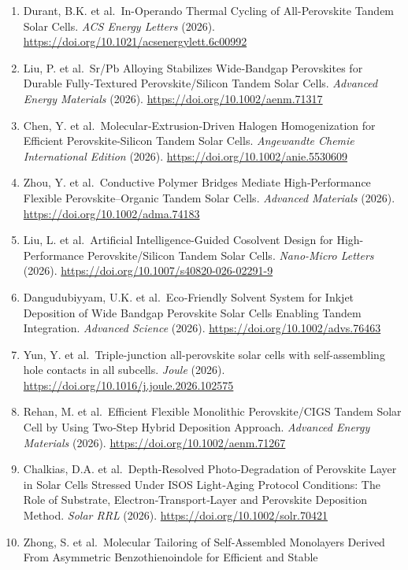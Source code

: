 \documentclass[
  11pt,
]{article}
\begin{document}
\begin{enumerate}
  Photovoltaics. \emph{Chemical Reviews} (2026).
  \url{https://doi.org/10.1021/acs.chemrev.5c01014}
\item
  Durant, B.K. et al.~In-Operando Thermal Cycling of All-Perovskite
  Tandem Solar Cells. \emph{ACS Energy Letters} (2026).
  \url{https://doi.org/10.1021/acsenergylett.6c00992}
\item
  Liu, P. et al.~Sr/Pb Alloying Stabilizes Wide‐Bandgap Perovskites for
  Durable Fully‐Textured Perovskite/Silicon Tandem Solar Cells.
  \emph{Advanced Energy Materials} (2026).
  \url{https://doi.org/10.1002/aenm.71317}
\item
  Chen, Y. et al.~Molecular‐Extrusion‐Driven Halogen Homogenization for
  Efficient Perovskite‐Silicon Tandem Solar Cells. \emph{Angewandte
  Chemie International Edition} (2026).
  \url{https://doi.org/10.1002/anie.5530609}
\item
  Zhou, Y. et al.~Conductive Polymer Bridges Mediate High‐Performance
  Flexible Perovskite--Organic Tandem Solar Cells. \emph{Advanced
  Materials} (2026). \url{https://doi.org/10.1002/adma.74183}
\item
  Liu, L. et al.~Artificial Intelligence-Guided Cosolvent Design for
  High-Performance Perovskite/Silicon Tandem Solar Cells.
  \emph{Nano-Micro Letters} (2026).
  \url{https://doi.org/10.1007/s40820-026-02291-9}
\item
  Dangudubiyyam, U.K. et al.~Eco‐Friendly Solvent System for Inkjet
  Deposition of Wide Bandgap Perovskite Solar Cells Enabling Tandem
  Integration. \emph{Advanced Science} (2026).
  \url{https://doi.org/10.1002/advs.76463}
\item
  Yun, Y. et al.~Triple-junction all-perovskite solar cells with
  self-assembling hole contacts in all subcells. \emph{Joule} (2026).
  \url{https://doi.org/10.1016/j.joule.2026.102575}
\item
  Rehan, M. et al.~Efficient Flexible Monolithic Perovskite/CIGS Tandem
  Solar Cell by Using Two‐Step Hybrid Deposition Approach.
  \emph{Advanced Energy Materials} (2026).
  \url{https://doi.org/10.1002/aenm.71267}
\item
  Chalkias, D.A. et al.~Depth‐Resolved Photo‐Degradation of Perovskite
  Layer in Solar Cells Stressed Under ISOS Light‐Aging Protocol
  Conditions: The Role of Substrate, Electron‐Transport‐Layer and
  Perovskite Deposition Method. \emph{Solar RRL} (2026).
  \url{https://doi.org/10.1002/solr.70421}
\item
  Zhong, S. et al.~Molecular Tailoring of Self‐Assembled Monolayers
  Derived From Asymmetric Benzothienoindole for Efficient and Stable

\end{enumerate}
\end{document}
